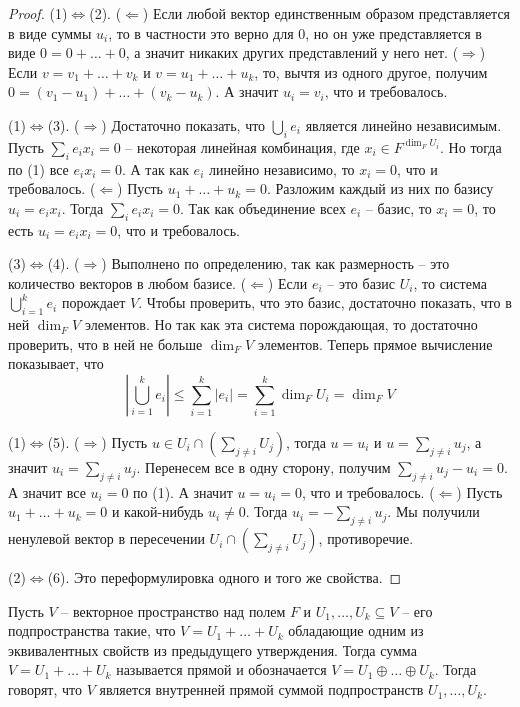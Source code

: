 \begin{proof}
(1)$\Leftrightarrow$(2).
($\Leftarrow$) Если любой вектор единственным образом представляется в виде суммы $u_i$, то в частности это верно для $0$, но он уже представляется в виде $0 = 0 + \ldots + 0$, а значит никаких других представлений у него нет.
($\Rightarrow$) Если $v = v_1 + \ldots + v_k$ и $v = u_1 + \ldots + u_k$, то, вычтя из одного другое, получим $0 = (v_1 - u_1) + \ldots + (v_k - u_k)$.
А значит $u_i = v_i$, что и требовалось.

(1)$\Leftrightarrow$(3).
($\Rightarrow$) Достаточно показать, что $\bigcup_i e_i$ является линейно независимым.
Пусть $\sum_i e_i x_i = 0$ -- некоторая линейная комбинация, где $x_i\in F^{\dim_F U_i}$.
Но тогда по (1) все $e_i x_i = 0$.
А так как $e_i$ линейно независимо, то $x_i = 0$, что и требовалось.
($\Leftarrow$) Пусть $u_1 + \ldots + u_k = 0$.
Разложим каждый из них по базису $u_i = e_i x_i$.
Тогда $\sum_i e_i x_i = 0$.
Так как объединение всех $e_i$ -- базис, то $x_i = 0$, то есть $u_i = e_i x_i = 0$, что и требовалось.

(3)$\Leftrightarrow$(4).
($\Rightarrow$) Выполнено по определению, так как размерность -- это количество векторов в любом базисе.
($\Leftarrow$) Если $e_i$ -- это базис $U_i$, то система $\bigcup_{i=1}^k e_i$ порождает $V$.
Чтобы проверить, что это базис, достаточно показать, что в ней $\dim_F V$ элементов.
Но так как эта система порождающая, то достаточно проверить, что в ней не больше $\dim_F V$ элементов.
Теперь прямое вычисление показывает, что
\[
|\bigcup_{i=1}^k e_i|\leqslant \sum_{i=1}^k |e_i| = \sum_{i=1}^k \dim_F U_i = \dim_F V
\]


(1)$\Leftrightarrow$(5).
($\Rightarrow$) Пусть $u\in U_i\cap (\sum_{j\neq i} U_j)$, тогда $u = u_i$ и $u = \sum_{j\neq i} u_j$, а значит $u_i = \sum_{j\neq i} u _j$.
Перенесем все в одну сторону, получим $\sum_{j\neq i} u _j - u_i = 0$.
А значит все $u_i = 0$ по (1).
А значит $u = u_i = 0$, что и требовалось.
($\Leftarrow$) Пусть $u_1 + \ldots + u_k = 0$ и какой-нибудь $u_i\neq 0$.
Тогда $u_i = - \sum_{j\neq i}u_j$.
Мы получили ненулевой вектор в пересечении $U_i \cap (\sum_{j\neq i}U_j)$, противоречие.

(2)$\Leftrightarrow$(6).
Это переформулировка одного и того же свойства.

\end{proof}

\begin{definition}
Пусть $V$ -- векторное пространство над полем $F$ и $U_1,\ldots,U_k \subseteq V$ -- его подпространства такие, что $V = U_1+\ldots + U_k$ обладающие одним из эквивалентных свойств из предыдущего утверждения.
Тогда сумма $V = U_1+\ldots + U_k$  называется прямой и обозначается $V = U_1\oplus\ldots\oplus U_k$.
Тогда говорят, что $V$ является внутренней прямой суммой подпространств $U_1,\ldots,U_k$.
\end{definition}

